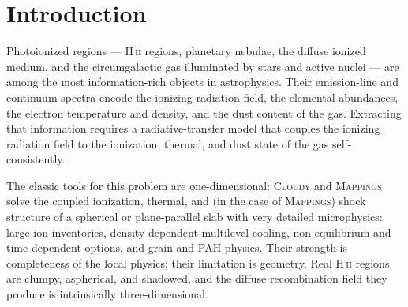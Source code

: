 \documentclass[twocolumn,linenumbers]{aastex702}
\newcommand{\MoCHII}{\textsc{MoCHII}}
\newcommand{\HII}{H\,\textsc{ii}}
\newcommand{\Te}{T_{\mathrm{e}}}
\newcommand{\nelec}{n_{\mathrm{e}}}
\begin{document}
\begin{abstract}
and $0.2\%$ (HII20), with the He$^{+}$/H$^{+}$ ratio and the outer radius
inside the published multi-code ranges; the cooling itself is
cross-validated channel by channel against a \textsc{Cloudy} c25.00
decomposition on a fixed $(\Te, \nelec, \mathrm{ionization})$ state, where
it agrees to $1\%$.  We further demonstrate
solution-driven ionization-front re-refinement (a re-refined octree
reproduces a native high-resolution grid to $+0.008\%$ in ionized volume
with $4.5\times$ fewer cells), the complete dust and PAH coupling (grain
heating energy closure $L_{\mathrm{IR}}/L_{\mathrm{abs}} = 1.000$; the
projected 8\,$\mu$m image turning from a central peak into a
limb-brightened ionization-front annulus as PAHs are destroyed in ionized
gas), and an atomic photodissociation-region
skin with photoelectric heating.  \MoCHII{} is written for modern
three-dimensional synthetic observations of \HII{} regions and their
surroundings.
\end{abstract}


\section{Introduction}
\label{sec:intro}

Photoionized regions --- \HII{} regions, planetary nebulae, the diffuse
ionized medium, and the circumgalactic gas illuminated by stars and
active nuclei --- are among the most information-rich objects in
astrophysics.  Their emission-line and continuum spectra encode the
ionizing radiation field, the elemental abundances, the electron
temperature and density, and the dust content of the gas.  Extracting
that information requires a radiative-transfer model that couples the
ionizing radiation field to the ionization, thermal, and dust state of
the gas self-consistently.

The classic tools for this problem are one-dimensional: \textsc{Cloudy}
\citep{cloudy2017,cloudy2023} and \textsc{Mappings}
\citep{sutherland1993,mappingsv2017} solve the coupled ionization,
thermal, and (in the case of \textsc{Mappings}) shock structure of a
spherical or plane-parallel slab with very detailed microphysics: large
ion inventories, density-dependent multilevel cooling, non-equilibrium
and time-dependent options, and grain and PAH physics.  Their strength is
completeness of the local physics; their limitation is geometry.  Real
\HII{} regions are clumpy, aspherical, and shadowed, and the diffuse
recombination field they produce is intrinsically three-dimensional.
\end{document}
